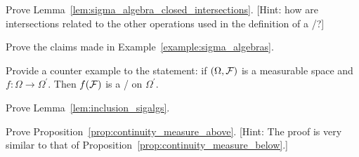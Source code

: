 \begin{problem}\label{prb:sigma_algebra_closed_intersections}
Prove Lemma~\ref{lem:sigma_algebra_closed_intersections}. [Hint: how are intersections related to the other operations used in the definition of a \sigalg/?]
\end{problem}

\begin{problem}\label{prb:example_sigalgs}
Prove the claims made in Example~\ref{example:sigma_algebras}.
\end{problem}



\begin{problem}\label{prb:converse_preimage_sigma_algebra}
Provide a counter example to the statement: if $(\Omega, \mathcal F)$ is a measurable space and $f : \Omega \to \Omega^\prime$. Then $f(\mathcal F)$ is a \sigalg/ on $\Omega^\prime$.
\end{problem}

\begin{problem}\label{prb:inclusion_sigalgs}
Prove Lemma~\ref{lem:inclusion_sigalgs}.
\end{problem}

\begin{problem}\label{prb:proof_continuity_above}
Prove Proposition~\ref{prop:continuity_measure_above}. [Hint: The proof is very similar to that of Proposition~\ref{prop:continuity_measure_below}.]
\end{problem}

